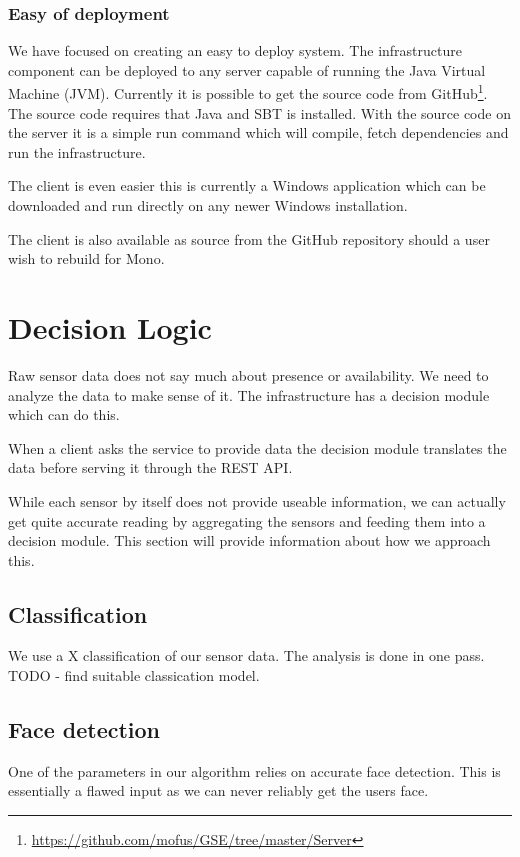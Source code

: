 \documentclass{sigchi}
\begin{document}
\subsubsection{Easy of deployment}
We have focused on creating an easy to deploy system.
The infrastructure component can be deployed to any server capable of running the Java Virtual Machine (JVM).
Currently it is possible to get the source code from GitHub\footnote{\url{https://github.com/mofus/GSE/tree/master/Server}}.
The source code requires that Java and SBT is installed.
With the source code on the server it is a simple run command which will compile, fetch dependencies and run the infrastructure.

The client is even easier this is currently a Windows application which can be downloaded and run directly on any newer Windows installation.

The client is also available as source from the GitHub repository should a user wish to rebuild for Mono.

\section{Decision Logic}
Raw sensor data does not say much about presence or availability.
We need to analyze the data to make sense of it.
The infrastructure has a decision module which can do this.

When a client asks the service to provide data the decision module translates the data before serving it through the REST API.

While each sensor by itself does not provide useable information, we can actually get quite accurate reading by aggregating the sensors and feeding them into a decision module.
This section will provide information about how we approach this.

\subsection{Classification}
We use a X classification of our sensor data.
The analysis is done in one pass.
TODO - find suitable classication model.

\subsection{Face detection}
One of the parameters in our algorithm relies on accurate face detection.
This is essentially a flawed input as we can never reliably get the users face.
\end{document}
